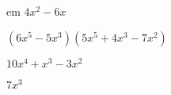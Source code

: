 \documentclass{article}
\begin{document}
\begin{multicols}{2}
em $4x^2-6x$\item $(6x^{5}-5x^{3})(5x^{5}+4x^{3}-7x^2)$\item $10x^{4}+x^{3}-3x^2$\item $7x^{3}$
\end{multicols}
\end{document}
